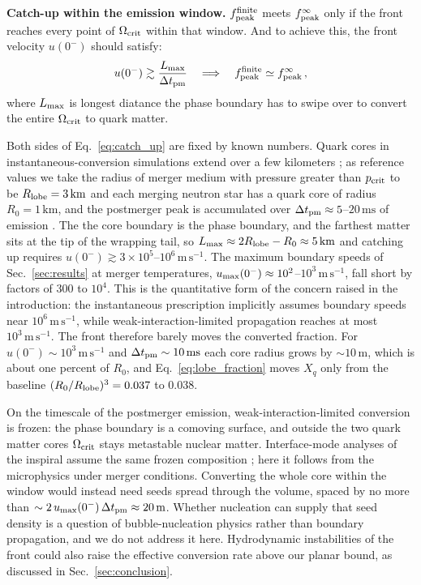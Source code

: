 \documentclass[10pt,superscriptaddress,amsmath,aps,prc,twocolumn,nofootinbib,floatfix]{revtex4-1}
\newcommand{\m}{\text{m}}
\newcommand{\km}{\text{km}}
\newcommand{\s}{\text{s}}
\begin{document}
\textbf{Catch-up within the emission window.}
$f_{\rm peak}^{\rm finite}$ meets $f_{\rm peak}^{\infty}$ only if the front reaches every point of $\Omega_{\rm crit}$ within that window. 
And to achieve this, the front velocity $u(0^-)$ should satisfy:
\begin{equation}
u(0^-)\gtrsim\frac{L_{\rm max}}{\Delta t_{\rm pm}}
\quad\Longrightarrow\quad
f_{\rm peak}^{\rm finite}\simeq f_{\rm peak}^{\infty}\,,
\label{eq:catch_up}
\end{equation}
where $L_{\rm max}$ is longest diatance the phase boundary has to swipe over to convert the entire $\Omega_{\rm crit}$ to quark matter. %

Both sides of Eq.~\eqref{eq:catch_up} are fixed by known numbers.
Quark cores in instantaneous-conversion simulations extend over a few kilometers \cite{Most:2018eaw,Bauswein:2018bma}; as reference values we take the radius of merger medium with pressure greater than $p_{\rm crit}$ to be $R_{\rm lobe}=3\,\km$ and each merging neutron star has a quark core of radius $R_0=1\,\km$, and the postmerger peak is accumulated over $\Delta t_{\rm pm}\approx5$--$20\,\text{ms}$ of emission \cite{Takami:2014tva,Vretinaris:2019spn}.
The the core boundary is the phase boundary, and the farthest matter sits at the tip of the wrapping tail, so $L_{\rm max}\approx2R_{\rm lobe}-R_0\approx5\,\km$ and catching up requires $u(0^-)\gtrsim3\times10^{5}$--$10^{6}\,\m\,\s^{-1}$.
The maximum boundary speeds of Sec.~\ref{sec:results} at merger temperatures, $u_{\rm max}(0^-)\approx10^{2}$--$10^{3}\,\m\,\s^{-1}$, fall short by factors of $300$ to $10^{4}$.
This is the quantitative form of the concern raised in the introduction: the instantaneous prescription implicitly assumes boundary speeds near $10^{6}\,\m\,\s^{-1}$, while weak-interaction-limited propagation reaches at most $10^{3}\,\m\,\s^{-1}$.
The front therefore barely moves the converted fraction.
For $u(0^-)\sim 10^{3}\,\m\,\s^{-1}$ and $\Delta t_{\rm pm}\sim 10\,\text{ms}$ each core radius grows by $\sim 10\,\m$, which is about one percent of $R_0$, and Eq.~\eqref{eq:lobe_fraction} moves $X_q$ only from the baseline $(R_0/R_{\rm lobe})^3=0.037$ to $0.038$.

On the timescale of the postmerger emission, weak-interaction-limited conversion is frozen: the phase boundary is a comoving surface, and outside the two quark matter cores $\Omega_{\rm crit}$ stays metastable nuclear matter.
Interface-mode analyses of the inspiral assume the same frozen composition \cite{Tonetto:2020bie,Counsell:2025hcv,Pereira:2025xsi}; here it follows from the microphysics under merger conditions.
Converting the whole core within the window would instead need seeds spread through the volume, spaced by no more than $\sim2\,u_{\rm max}(0^-)\,\Delta t_{\rm pm}\approx20\,\m$.
Whether nucleation can supply that seed density is a question of bubble-nucleation physics rather than boundary propagation, and we do not address it here.
Hydrodynamic instabilities of the front could also raise the effective conversion rate above our planar bound, as discussed in Sec.~\ref{sec:conclusion}.
\end{document}
